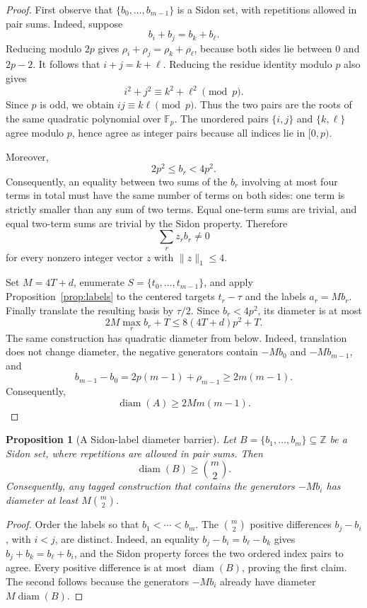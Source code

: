 \documentclass[11pt]{article}
\newtheorem{proposition}{Proposition}
\newcommand{\Z}{\mathbb{Z}}
\begin{document}
\begin{proof}
First observe that $\{b_0,\ldots,b_{m-1}\}$ is a Sidon set, with repetitions
allowed in pair sums. Indeed, suppose
\[
 b_i+b_j=b_k+b_\ell.
\]
Reducing modulo $2p$ gives $\rho_i+\rho_j=\rho_k+\rho_\ell$, because both sides
lie between $0$ and $2p-2$. It follows that $i+j=k+\ell$. Reducing the residue
identity modulo $p$ also gives
\[
 i^2+j^2\equiv k^2+\ell^2\pmod p.
\]
Since $p$ is odd, we obtain $ij\equiv k\ell\pmod p$. Thus the two pairs are the
roots of the same quadratic polynomial over $\mathbb F_p$. The unordered
pairs $\{i,j\}$ and $\{k,\ell\}$ agree modulo $p$, hence agree as integer pairs
because all indices lie in $[0,p)$.

Moreover,
\[
 2p^2\leq b_r<4p^2.
\]
Consequently, an equality between two sums of the $b_r$ involving at most four
terms in total must have the same number of terms on both sides: one term is
strictly smaller than any sum of two terms. Equal one-term sums are trivial,
and equal two-term sums are trivial by the Sidon property. Therefore
\[
 \sum_r z_rb_r\neq 0
\]
for every nonzero integer vector $z$ with $\lVert z\rVert_1\leq 4$.

Set $M=4T+d$, enumerate $S=\{t_0,\ldots,t_{m-1}\}$, and apply
Proposition~\ref{prop:labels} to the centered targets $t_r-\tau$ and the labels
$a_r=Mb_r$. Finally translate the resulting basis by $\tau/2$. Since
$b_r<4p^2$, its diameter is at most
\[
 2M\max_r b_r+T\leq 8(4T+d)p^2+T.
\]
The same construction has quadratic diameter from below. Indeed, translation
does not change diameter, the negative generators contain
$-Mb_0$ and $-Mb_{m-1}$, and
\[
 b_{m-1}-b_0
 =2p(m-1)+\rho_{m-1}
 \geq 2m(m-1).
\]
Consequently,
\[
 \operatorname{diam}(A)\geq 2M m(m-1).
\]
\end{proof}

\begin{proposition}[A Sidon-label diameter barrier]\label{prop:sidon-barrier}
Let $B=\{b_1,\ldots,b_m\}\subseteq\Z$ be a Sidon set, where repetitions are
allowed in pair sums. Then
\[
 \operatorname{diam}(B)\geq \binom{m}{2}.
\]
Consequently, any tagged construction that contains the generators
$-Mb_i$ has diameter at least $M\binom{m}{2}$.
\end{proposition}

\begin{proof}
Order the labels so that $b_1<\cdots<b_m$. The $\binom{m}{2}$ positive
differences $b_j-b_i$, with $i<j$, are distinct. Indeed, an equality
$b_j-b_i=b_\ell-b_k$ gives $b_j+b_k=b_\ell+b_i$, and the Sidon property
forces the two ordered index pairs to agree. Every positive difference is at
most $\operatorname{diam}(B)$, proving the first claim. The second follows
because the generators $-Mb_i$ already have diameter
$M\operatorname{diam}(B)$.
\end{proof}
\end{document}
